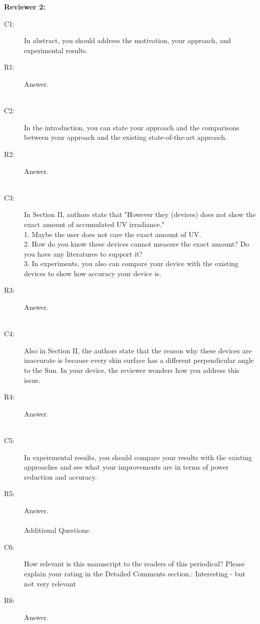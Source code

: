 \documentclass[onecolumn]{IEEEconf}
\begin{document}
\textbf{Reviewer 2:}
\begin{description}
\item [C1: ] In abstract, you should address the motivation, your approach, and experimental results.
\item [R1: ] Answer.\\
~\\

\item [C2: ] In the introduction, you can state your approach and the comparisons between your approach and the existing state-of-the-art approach.
\item [R2: ] Answer.\\
~\\

\item [C3: ] In Section II, authors state that "However they (devices) does not show the exact amount of accumulated UV irradiance." \\
1. Maybe the user does not care the exact amount of UV. \\
2. How do you know these devices cannot measure the exact amount? Do you have any literatures to support it?\\
3. In experiments, you also can compare your device with the existing devices to show how accuracy your device is.
\item [R3: ] Answer.\\
~\\

\item [C4: ] Also in Section II, the authors state that the reason why these devices are inaccurate is because every skin surface has a different perpendicular angle to the Sun. In your device, the reviewer wonders how you address this issue.
\item [R4: ] Answer.\\
~\\

\item [C5: ] In expeirmental results, you should compare your results with the existing approaches and see what your improvements are in terms of power reduction and accuracy.
\item [R5: ] Answer.\\
~\\

Additional Questions:
\item [C6: ] How relevant is this manuscript to the readers of this periodical? Please explain your rating in the Detailed Comments section.: Interesting - but not very relevant
\item [R6: ] Answer.\\
~\\


\end{description}
\end{document}
